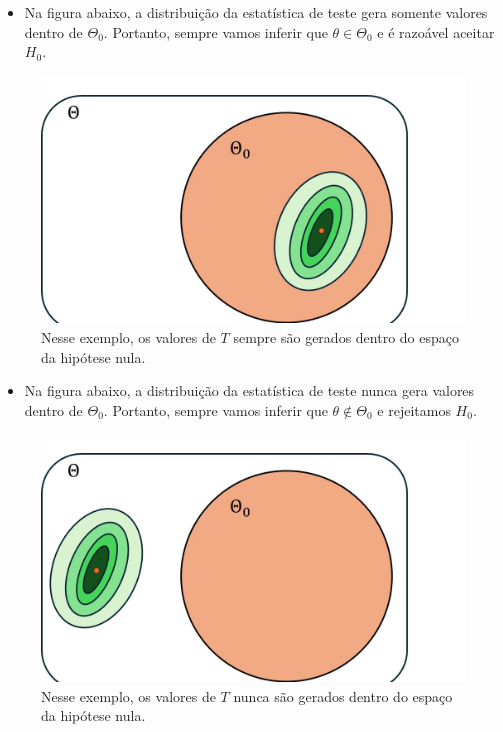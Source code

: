 \documentclass[
  letterpaper,
  DIV=11,
  numbers=noendperiod]{scrartcl}
\providecommand{\tightlist}{%
  \setlength{\itemsep}{0pt}\setlength{\parskip}{0pt}}\usepackage{longtable,booktabs,array}
\begin{document}
\begin{itemize}
\tightlist
\item
  Na figura abaixo, a distribuição da estatística de teste gera somente
  valores dentro de \(\Theta_0\). Portanto, sempre vamos inferir que
  \(\theta\in\Theta_0\) e é razoável aceitar \(H_0\).
\end{itemize}

\begin{figure}

{\centering \includegraphics{fig_testA.jpg}

}

\caption{Nesse exemplo, os valores de \(T\) sempre são gerados dentro do
espaço da hipótese nula.}

\end{figure}%

\begin{itemize}
\tightlist
\item
  Na figura abaixo, a distribuição da estatística de teste nunca gera
  valores dentro de \(\Theta_0\). Portanto, sempre vamos inferir que
  \(\theta\notin\Theta_0\) e rejeitamos \(H_0\).
\end{itemize}

\begin{figure}

{\centering \includegraphics{fig_testB.jpg}

}

\caption{Nesse exemplo, os valores de \(T\) nunca são gerados dentro do
espaço da hipótese nula.}

\end{figure}%
\end{document}
